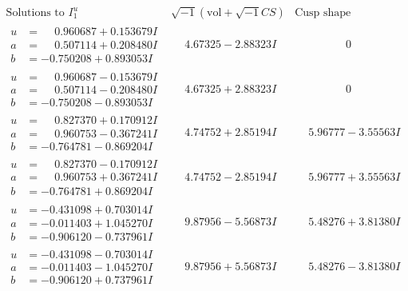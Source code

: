 \documentclass[1p]{elsarticle_modified}
\theoremstyle{definition}
\newcommand{\I}{\sqrt{-1}}
\begin{document}
$$\begin{array}{c|c|c}  
\text{Solutions to }I^u_{1}& \I (\text{vol} + \sqrt{-1}CS) & \text{Cusp shape}\\
 \hline 
\begin{aligned}
u &= \phantom{-}0.960687 + 0.153679 I \\
a &= \phantom{-}0.507114 + 0.208480 I \\
b &= -0.750208 + 0.893053 I\end{aligned}
 & \phantom{-}4.67325 - 2.88323 I & \phantom{-0.000000 } 0 \\ \hline\begin{aligned}
u &= \phantom{-}0.960687 - 0.153679 I \\
a &= \phantom{-}0.507114 - 0.208480 I \\
b &= -0.750208 - 0.893053 I\end{aligned}
 & \phantom{-}4.67325 + 2.88323 I & \phantom{-0.000000 } 0 \\ \hline\begin{aligned}
u &= \phantom{-}0.827370 + 0.170912 I \\
a &= \phantom{-}0.960753 - 0.367241 I \\
b &= -0.764781 - 0.869204 I\end{aligned}
 & \phantom{-}4.74752 + 2.85194 I & \phantom{-}5.96777 - 3.55563 I \\ \hline\begin{aligned}
u &= \phantom{-}0.827370 - 0.170912 I \\
a &= \phantom{-}0.960753 + 0.367241 I \\
b &= -0.764781 + 0.869204 I\end{aligned}
 & \phantom{-}4.74752 - 2.85194 I & \phantom{-}5.96777 + 3.55563 I \\ \hline\begin{aligned}
u &= -0.431098 + 0.703014 I \\
a &= -0.011403 + 1.045270 I \\
b &= -0.906120 - 0.737961 I\end{aligned}
 & \phantom{-}9.87956 - 5.56873 I & \phantom{-}5.48276 + 3.81380 I \\ \hline\begin{aligned}
u &= -0.431098 - 0.703014 I \\
a &= -0.011403 - 1.045270 I \\
b &= -0.906120 + 0.737961 I\end{aligned}
 & \phantom{-}9.87956 + 5.56873 I & \phantom{-}5.48276 - 3.81380 I \\ \hline\begin{aligned}

\end{aligned}
\end{array}$$
\end{document}
